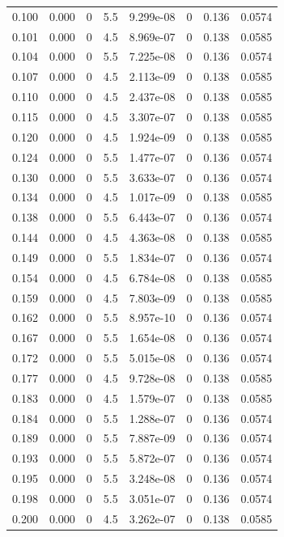 \documentclass[preview]{standalone}
\begin{document}
{{\begin{tabular}{L{1.2cm}C{1.2cm} C{0.3cm}C{0.5cm} C{1.4cm}C{1.4cm} C{1.4cm}C{1.4cm}}
  0.100  &  0.000  & 0     & 5.5 &  9.299e-08  & 0  & 0.136 &  0.0574   \\ 
  0.101  &  0.000  & 0     & 4.5 &  8.969e-07  & 0  & 0.138 &  0.0585   \\ 
  0.104  &  0.000  & 0     & 5.5 &  7.225e-08  & 0  & 0.136 &  0.0574   \\ 
  0.107  &  0.000  & 0     & 4.5 &  2.113e-09  & 0  & 0.138 &  0.0585   \\ 
  0.110  &  0.000  & 0     & 4.5 &  2.437e-08  & 0  & 0.138 &  0.0585   \\ 
  0.115  &  0.000  & 0     & 4.5 &  3.307e-07  & 0  & 0.138 &  0.0585   \\ 
  0.120  &  0.000  & 0     & 4.5 &  1.924e-09  & 0  & 0.138 &  0.0585   \\ 
  0.124  &  0.000  & 0     & 5.5 &  1.477e-07  & 0  & 0.136 &  0.0574   \\ 
  0.130  &  0.000  & 0     & 5.5 &  3.633e-07  & 0  & 0.136 &  0.0574   \\ 
  0.134  &  0.000  & 0     & 4.5 &  1.017e-09  & 0  & 0.138 &  0.0585   \\ 
  0.138  &  0.000  & 0     & 5.5 &  6.443e-07  & 0  & 0.136 &  0.0574   \\ 
  0.144  &  0.000  & 0     & 4.5 &  4.363e-08  & 0  & 0.138 &  0.0585   \\ 
  0.149  &  0.000  & 0     & 5.5 &  1.834e-07  & 0  & 0.136 &  0.0574   \\ 
  0.154  &  0.000  & 0     & 4.5 &  6.784e-08  & 0  & 0.138 &  0.0585   \\ 
  0.159  &  0.000  & 0     & 4.5 &  7.803e-09  & 0  & 0.138 &  0.0585   \\ 
  0.162  &  0.000  & 0     & 5.5 &  8.957e-10  & 0  & 0.136 &  0.0574   \\ 
  0.167  &  0.000  & 0     & 5.5 &  1.654e-08  & 0  & 0.136 &  0.0574   \\ 
  0.172  &  0.000  & 0     & 5.5 &  5.015e-08  & 0  & 0.136 &  0.0574   \\ 
  0.177  &  0.000  & 0     & 4.5 &  9.728e-08  & 0  & 0.138 &  0.0585   \\ 
  0.183  &  0.000  & 0     & 4.5 &  1.579e-07  & 0  & 0.138 &  0.0585   \\ 
  0.184  &  0.000  & 0     & 5.5 &  1.288e-07  & 0  & 0.136 &  0.0574   \\ 
  0.189  &  0.000  & 0     & 5.5 &  7.887e-09  & 0  & 0.136 &  0.0574   \\ 
  0.193  &  0.000  & 0     & 5.5 &  5.872e-07  & 0  & 0.136 &  0.0574   \\ 
  0.195  &  0.000  & 0     & 5.5 &  3.248e-08  & 0  & 0.136 &  0.0574   \\ 
  0.198  &  0.000  & 0     & 5.5 &  3.051e-07  & 0  & 0.136 &  0.0574   \\ 
  0.200  &  0.000  & 0     & 4.5 &  3.262e-07  & 0  & 0.138 &  0.0585   \\ 
\hline 
\end{tabular} 

}}
\end{document}
